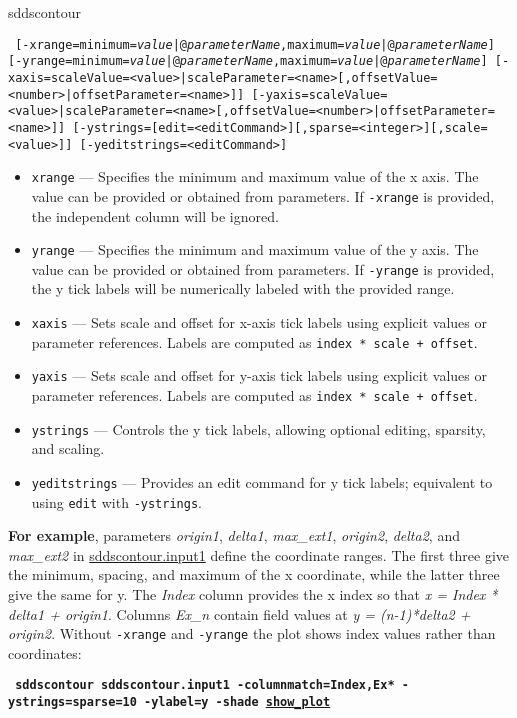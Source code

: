 \begin{sddsprog}{sddscontour}
\begin{itemize}
\begin{flushleft}{\tt
[-xrange=minimum={\em value}|@{\em parameterName},maximum={\em value}|@{\em parameterName}]
[-yrange=minimum={\em value}|@{\em parameterName},maximum={\em value}|@{\em parameterName}]
[-xaxis=scaleValue=<value>|scaleParameter=<name>[,offsetValue=<number>|offsetParameter=<name>]]
[-yaxis=scaleValue=<value>|scaleParameter=<name>[,offsetValue=<number>|offsetParameter=<name>]]
[-ystrings=[edit=<editCommand>][,sparse=<integer>][,scale=<value>]]
[-yeditstrings=<editCommand>]
}\end{flushleft}
        \begin{itemize}
        \item \verb|xrange| --- Specifies the minimum and maximum value of the x axis. The value can be provided or obtained from parameters.
                If \verb|-xrange| is provided, the independent column will be ignored.
        \item \verb|yrange| --- Specifies the minimum and maximum value of the y axis. The value can be provided or obtained from parameters.
                If \verb|-yrange| is provided, the y tick labels will be numerically labeled with the provided range.
        \item \verb|xaxis| --- Sets scale and offset for x-axis tick labels using explicit values or parameter references. Labels are computed as \verb|index * scale + offset|.
        \item \verb|yaxis| --- Sets scale and offset for y-axis tick labels using explicit values or parameter references. Labels are computed as \verb|index * scale + offset|.
        \item \verb|ystrings| --- Controls the y tick labels, allowing optional editing, sparsity, and scaling.
        \item \verb|yeditstrings| --- Provides an edit command for y tick labels; equivalent to using \verb|edit| with \verb|-ystrings|.
        \end{itemize}
        {\bf For example}, parameters {\em origin1}, {\em delta1}, {\em max\_ext1}, {\em origin2}, {\em delta2}, and {\em max\_ext2} in \href{https://ops.aps.anl.gov/manuals/example_files/sddscontour.input1}{sddscontour.input1} define the coordinate ranges.
        The first three give the minimum, spacing, and maximum of the x coordinate, while the latter three give the same for y.
        The {\em Index} column provides the x index so that {\em x = Index * delta1 + origin1}.  Columns {\em Ex_n} contain field
        values at {\em y = (n-1)*delta2 + origin2}.  Without \verb|-xrange| and \verb|-yrange| the plot shows index values rather
        than coordinates:
        \begin{flushleft}{\tt \bf
            sddscontour sddscontour.input1 -columnmatch=Index,Ex* -ystrings=sparse=10 -ylabel=y -shade
            \href{https://ops.aps.anl.gov/manuals/example_files/sddscontour1_img.html}{show\_plot}
        }\end{flushleft}


\end{itemize}
\end{sddsprog}
